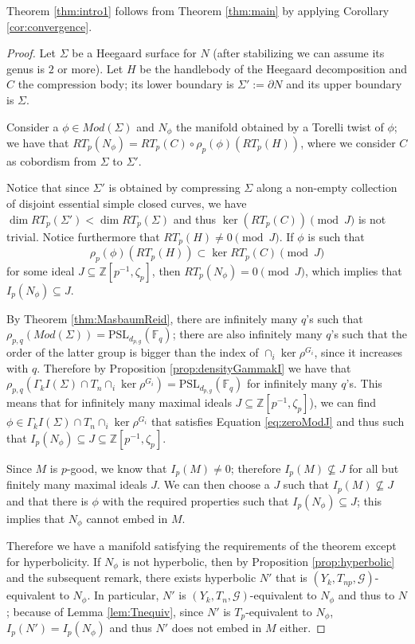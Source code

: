 \documentclass[12pt]{amsart}
\theoremstyle{definition}
\newcommand{\Z}{\mathbb{Z}}
\begin{document}
Theorem \ref{thm:intro1} follows from Theorem \ref{thm:main} by applying Corollary \ref{cor:convergence}.
\begin{proof}
	Let $\Sigma$ be a Heegaard surface for $N$ (after stabilizing we can assume its genus is $2$ or more). Let $H$ be the handlebody of the Heegaard decomposition and $C$ the compression body; its lower boundary is $\Sigma':=\partial N$ and its upper boundary is $\Sigma$. 	
	
	Consider a $\phi\in Mod(\Sigma)$ and $N_\phi$ the manifold obtained by a Torelli twist of $\phi$; we have that $RT_p(N_\phi)=RT_p(C)\circ \rho_p(\phi)(RT_p(H))$, where we consider $C$ as cobordism from $\Sigma$ to $\Sigma'$. 
	
	Notice that since $\Sigma'$ is obtained by compressing $\Sigma$ along a non-empty collection of disjoint essential simple closed curves, we have $\dim RT_p(\Sigma')<\dim RT_p(\Sigma)$ and thus $\ker(RT_p(C))\pmod{J}$ is not trivial. Notice furthermore that $RT_p(H)\neq 0 \pmod{J}$. If $\phi$ is such that 
	\begin{equation}\label{eq:zeroModJ}\rho_p(\phi)(RT_p(H)) \subset \ker RT_p(C) \pmod{ J}\end{equation} for some ideal $J\subseteq \Z\left[p^{-1},\zeta_p\right]$, then $RT_p(N_\phi)=0 \pmod{ J}$, which implies that $I_p(N_\phi)\subseteq J$.
	
	By Theorem \ref{thm:MasbaumReid}, there are infinitely many $q$'s such that $\rho_{p,q}(Mod(\Sigma))=\mathrm{PSL}_{d_{p,g}}(\mathbb{F}_q)$; there are also infinitely many $q$'s such that the order of the latter group is bigger than the index of $\cap_i \ker \rho^{G_i}$, since it increases with $q$. Therefore by Proposition \ref{prop:densityGammakI} we have that $\rho_{p,q}(\Gamma_kI(\Sigma)\cap T_n\cap_i \ker\rho^{G_i})=\mathrm{PSL}_{d_{p,g}}(\mathbb{F}_{q})$ for infinitely many $q$'s. This means that for infinitely many  maximal ideals $J\subseteq \Z[p^{-1},\zeta_p]$), we can find $\phi\in \Gamma_kI(\Sigma)\cap T_n\cap_i \ker\rho^{G_i}$ that satisfies Equation \ref{eq:zeroModJ} and thus such that $I_p(N_\phi)\subseteq J\subseteq \Z[p^{-1},\zeta_p]$.
	
	Since $M$ is $p$-good, we know that $I_p(M)\neq 0$; therefore $I_p(M)\nsubseteq J$ for all but finitely many maximal ideals $J$. We can then choose a $J$ such that $I_p(M)\nsubseteq J$ and that there is $\phi$ with the required properties such that $I_p(N_\phi)\subseteq J$; this implies that $N_\phi$ cannot embed in $M$. 
	
	Therefore we have a manifold satisfying the requirements of the theorem except for hyperbolicity. If $N_\phi$ is not hyperbolic, then by Proposition \ref{prop:hyperbolic} and the subsequent remark, there exists hyperbolic $N'$ that is $(Y_k, T_{np},\mathcal{G})$-equivalent to $N_\phi$. In particular, $N'$ is $(Y_k,T_n,\mathcal{G})$-equivalent to $N_\phi$ and thus to $N$; because of Lemma \ref{lem:Tnequiv}, since $N'$ is $T_p$-equivalent to $N_\phi$, $I_p(N')=I_p(N_\phi)$ and thus $N'$ does not embed in $M$ either.

\end{proof}
\end{document}
